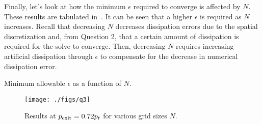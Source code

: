 Finally, let's look at how the minimum $\epsilon$ required to converge is affected by $N$.
These results are tabulated in~. It can be seen that a higher $\epsilon$ is
required as $N$ increases. Recall that decreasing $N$ decreases dissipation errors due to the
spatial discretization and, from Question 2, that a certain amount of dissipation is required
for the solve to converge. Then, decreasing $N$ requires increasing artificial
dissipation through $\epsilon$ to compensate for the decrease in numerical dissipation
error.

\begin{table}[H]
    \centering
    \caption{Minimum allowable $\epsilon$ as a function of $N$.}\label{tab:q3_eps}
    
\end{table}
\begin{figure}
    \centering
    \texttt{[image: ./figs/q3]}
    \caption{Results at $p_{\mathrm{exit}} = 0.72p_t$ for various grid sizes $N$.}\label{fig:q3}
\end{figure}


